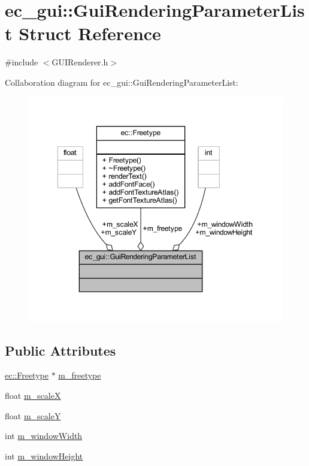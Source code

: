 \hypertarget{structec__gui_1_1_gui_rendering_parameter_list}{}\section{ec\+\_\+gui\+:\+:Gui\+Rendering\+Parameter\+List Struct Reference}
\label{structec__gui_1_1_gui_rendering_parameter_list}


{\ttfamily \#include $<$G\+U\+I\+Renderer.\+h$>$}



Collaboration diagram for ec\+\_\+gui\+:\+:Gui\+Rendering\+Parameter\+List\+:\nopagebreak
\begin{figure}[H]
\begin{center}
\leavevmode
\includegraphics[width=350pt]{structec__gui_1_1_gui_rendering_parameter_list__coll__graph}
\end{center}
\end{figure}
\subsection*{Public Attributes}
\begin{DoxyCompactItemize}
\item 
\mbox{\hyperlink{classec_1_1_freetype}{ec\+::\+Freetype}} $\ast$ \mbox{\hyperlink{structec__gui_1_1_gui_rendering_parameter_list_ac3644e85d752b23b91f0b4f463866e8a}{m\+\_\+freetype}}
\item 
float \mbox{\hyperlink{structec__gui_1_1_gui_rendering_parameter_list_a222b047c96b871ca4408020485a0dcba}{m\+\_\+scaleX}}
\item 
float \mbox{\hyperlink{structec__gui_1_1_gui_rendering_parameter_list_a21c5eeb521d1b6878780e62e886e85bc}{m\+\_\+scaleY}}
\item 
int \mbox{\hyperlink{structec__gui_1_1_gui_rendering_parameter_list_ab19d15d06c592cc30c1676d7a2b1b8d1}{m\+\_\+window\+Width}}
\item 
int \mbox{\hyperlink{structec__gui_1_1_gui_rendering_parameter_list_ab1932f5137b0c20a9e7270a7e555ea35}{m\+\_\+window\+Height}}
\end{DoxyCompactItemize}


